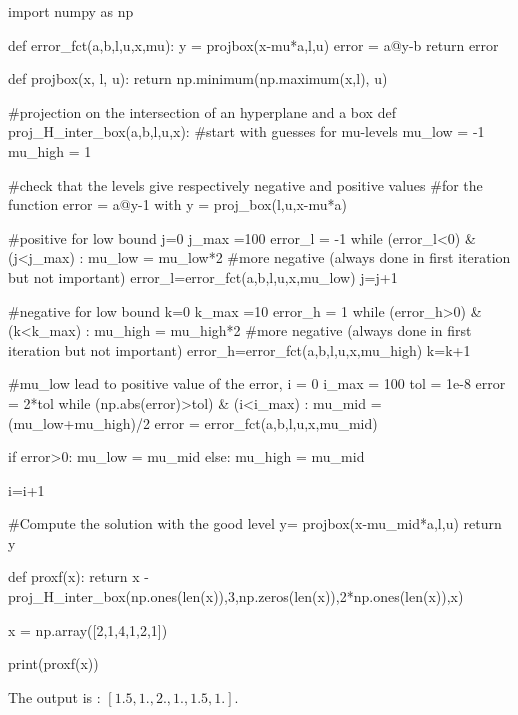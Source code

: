 \begin{python}
import numpy as np

def error_fct(a,b,l,u,x,mu):
    y = projbox(x-mu*a,l,u)
    error = a@y-b
    return error

def projbox(x, l, u):
    return np.minimum(np.maximum(x,l), u)

#projection on the intersection of an hyperplane and a box
def proj_H_inter_box(a,b,l,u,x):
    #start with guesses for mu-levels
    mu_low = -1
    mu_high = 1

    #check that the levels give respectively negative and positive values
    #for the function error = a@y-1 with y = proj_box(l,u,x-mu*a)

    #positive for low bound
    j=0
    j_max =100
    error_l = -1
    while (error_l<0) & (j<j_max) :
        mu_low = mu_low*2 #more negative (always done in first iteration but not important)
        error_l=error_fct(a,b,l,u,x,mu_low)
        j=j+1

    #negative for low bound
    k=0
    k_max =10
    error_h = 1
    while (error_h>0) & (k<k_max) :
        mu_high = mu_high*2 #more negative (always done in first iteration but not important)
        error_h=error_fct(a,b,l,u,x,mu_high)
        k=k+1

    #mu_low lead to positive value of the error,
    i = 0
    i_max = 100
    tol = 1e-8
    error = 2*tol
    while (np.abs(error)>tol) & (i<i_max) :
        mu_mid = (mu_low+mu_high)/2
        error = error_fct(a,b,l,u,x,mu_mid)

        if error>0:
            mu_low = mu_mid
        else:
            mu_high = mu_mid

        i=i+1

    #Compute the solution with the good level
    y= projbox(x-mu_mid*a,l,u)
    return y

def proxf(x):
    return x - proj_H_inter_box(np.ones(len(x)),3,np.zeros(len(x)),2*np.ones(len(x)),x)

x = np.array([2,1,4,1,2,1])

print(proxf(x))
\end{python}
%
The output is : $[1.5, 1., 2.,  1.,  1.5, 1. ]$.
%
